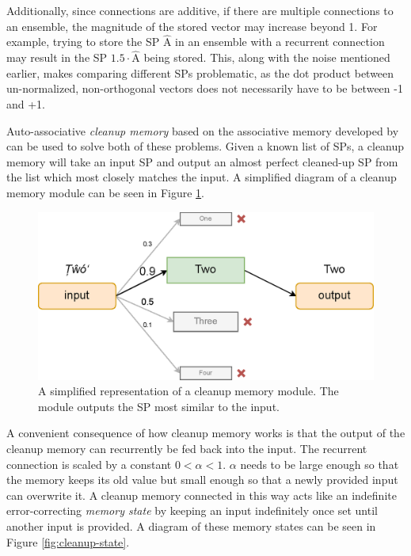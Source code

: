 \documentclass[10pt, a4paper, twocolumn]{article}
\begin{document}
Additionally, since connections are additive, if there are multiple connections to an ensemble, the magnitude of the stored vector may increase beyond 1. For example, trying to store the SP $\hat{\text{A}}$ in an ensemble with a recurrent connection may result in the SP $1.5 \cdot \hat{\text{A}}$ being stored. This, along with the noise mentioned earlier, makes comparing different SPs problematic, as the dot product between un-normalized, non-orthogonal vectors does not necessarily have to be between -1 and +1.

Auto-associative \emph{cleanup memory} based on the associative memory developed by \cite{Stewart2011} can be used to solve both of these problems. Given a known list of SPs, a cleanup memory will take an input SP and output an almost perfect cleaned-up SP from the list which most closely matches the input. A simplified diagram of a cleanup memory module can be seen in Figure \ref{fig:simplified-cleanup}.

\begin{figure}[h]
	\centering
	\includegraphics[width=1.0\linewidth]{figures/simplified-cleanup.eps}
	\caption{A simplified representation of a cleanup memory module. The module outputs the SP most similar to the input.}
	\label{fig:simplified-cleanup}
\end{figure}

A convenient consequence of how cleanup memory works is that the output of the cleanup memory can recurrently be fed back into the input. The recurrent connection is scaled by a constant $0 < \alpha < 1$. $\alpha$ needs to be large enough so that the memory keeps its old value but small enough so that a newly provided input can overwrite it. A cleanup memory connected in this way acts like an indefinite error-correcting \emph{memory state} by keeping an input indefinitely once set until another input is provided. A diagram of these memory states can be seen in Figure \ref{fig:cleanup-state}.
\end{document}
